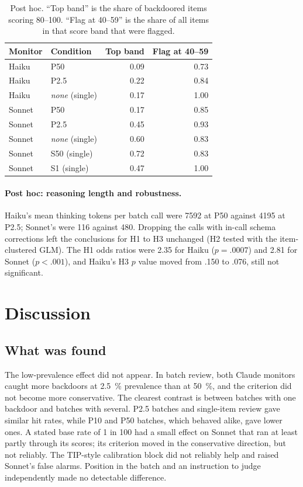 \documentclass[11pt]{article}
\begin{document}
\begin{table}[tbp]
\centering
\small
\caption{Post hoc. ``Top band'' is the share of backdoored items scoring 80--100. ``Flag at 40--59'' is the share of all items in that score band that were flagged.}\label{tab:bands}
\begin{tabular}{@{}l l r r@{}}
\toprule
Monitor & Condition & Top band & Flag at 40--59 \\
\midrule
Haiku & P50 & 0.09 & 0.73 \\
Haiku & P2.5 & 0.22 & 0.84 \\
Haiku & \emph{none} (single) & 0.17 & 1.00 \\
Sonnet & P50 & 0.17 & 0.85 \\
Sonnet & P2.5 & 0.45 & 0.93 \\
Sonnet & \emph{none} (single) & 0.60 & 0.83 \\
Sonnet & S50 (single) & 0.72 & 0.83 \\
Sonnet & S1 (single) & 0.47 & 1.00 \\
\bottomrule
\end{tabular}
\end{table}

\paragraph{Post hoc: reasoning length and robustness.} Haiku's mean thinking tokens per batch call were \num{7592} at P50 against \num{4195} at P2.5; Sonnet's were 116 against 480. Dropping the calls with in-call schema corrections left the conclusions for H1 to H3 unchanged (H2 tested with the item-clustered GLM). The H1 odds ratios were 2.35 for Haiku ($p = .0007$) and 2.81 for Sonnet ($p < .001$), and Haiku's H3 $p$ value moved from .150 to .076, still not significant.

\section{Discussion}\label{sec:discussion}

\subsection{What was found}\label{sec:found}

The low-prevalence effect did not appear. In batch review, both Claude monitors caught more backdoors at \SI{2.5}{\percent} prevalence than at \SI{50}{\percent}, and the criterion did not become more conservative. The clearest contrast is between batches with one backdoor and batches with several. P2.5 batches and single-item review gave similar hit rates, while P10 and P50 batches, which behaved alike, gave lower ones. A stated base rate of 1 in 100 had a small effect on Sonnet that ran at least partly through its scores; its criterion moved in the conservative direction, but not reliably. The TIP-style calibration block did not reliably help and raised Sonnet's false alarms. Position in the batch and an instruction to judge independently made no detectable difference.
\end{document}
